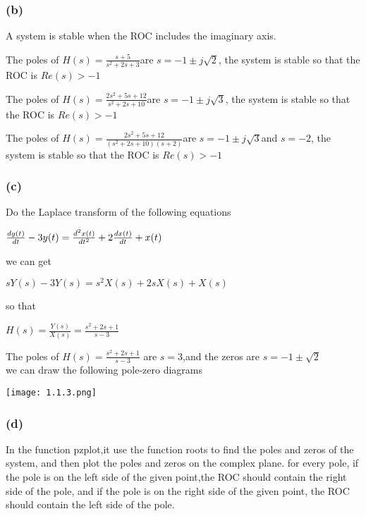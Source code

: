 \documentclass{article}
\begin{document}
\subsubsection*{(b)}
A system is stable when the ROC includes the imaginary axis. 

The poles of $H(s)=\frac{s+5}{s^2+2s+3}$are $s = -1 \pm j\sqrt{2}$,
the system is stable so that the ROC is $Re(s) > -1$

The poles of $H(s) = \frac{2s^2+5s+12}{s^2+2s+10}$are $s = -1 \pm j\sqrt{3}$,
the system is stable so that the ROC is $Re(s) > -1$

The poles of $H(s)=\frac{2s^2+5s+12}{(s^2+2s+10)(s+2)}$are $s = -1 \pm j\sqrt{3}$and $s = -2$,
the system is stable so that the ROC is $Re(s) > -1$

\subsubsection*{(c)}
Do the Laplace transform of the following equations
\begin{center}
    \begin{math}
        \centering
        \frac{dy(t)}{dt} - 3y(t) = \frac{d^2x(t)}{dt^2} + 2\frac{dx(t)}{dt} + x(t)
    \end{math}
\end{center}
we can get
\begin{center}
    \begin{math}
        sY(s) - 3Y(s) = s^2X(s) + 2sX(s) + X(s)
    \end{math}
\end{center}
so that
\begin{center}
    \begin{math}
        H(s) = \frac{Y(s)}{X(s)} = \frac{s^2+2s+1}{s-3}
    \end{math}
\end{center}

The poles of $H(s) = \frac{s^2+2s+1}{s-3}$ are $s = 3$,and the zeros are $s = -1 \pm \sqrt{2}$\\

we can draw the following pole-zero diagrams
\begin{center}
    \texttt{[image: 1.1.3.png]}
\end{center}

\subsubsection*{(d)}
In the function pzplot,it use the function roots to find the poles and zeros of the system, and then plot the poles and zeros on the complex plane.
for every pole, if the pole is on the left side of the given point,the ROC should contain the right side of the pole, and if the pole is on the right side of the given point, the ROC should contain the left side of the pole.\\
\end{document}
